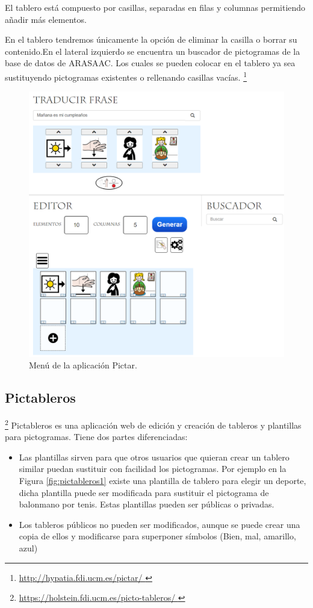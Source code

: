 El tablero está compuesto por casillas, separadas en filas y columnas permitiendo añadir más elementos.

En el tablero tendremos únicamente la opción de eliminar la casilla o borrar su contenido.En el lateral izquierdo se encuentra un buscador de pictogramas de la base de datos de ARASAAC. Los cuales se pueden colocar en el tablero ya sea sustituyendo pictogramas existentes o rellenando casillas vacías.
\footnote{\url{ http://hypatia.fdi.ucm.es/pictar/ }}

\begin{figure}[h!]
	\centering
	\includegraphics[width=0.7\linewidth]{Imagenes/Bitmap/Pictar}
	\caption{Menú de la aplicación Pictar.}
	\label{fig:pictar}
\end{figure}

\newpage
\subsection{Pictableros}
\footnote{\url{ https://holstein.fdi.ucm.es/picto-tableros/  }}
Pictableros es una aplicación web de edición y creación de tableros y plantillas para pictogramas. Tiene dos partes diferenciadas:

\begin{itemize}
	\item Las plantillas sirven para que otros usuarios que quieran crear un tablero similar puedan sustituir con facilidad los pictogramas. Por ejemplo en la Figura \ref{fig:pictableros1} existe una plantilla de tablero para elegir un deporte, dicha plantilla puede ser modificada para sustituir el pictograma de balonmano por tenis. Estas plantillas pueden ser públicas o privadas.
	
	\item Los tableros públicos no pueden ser modificados, aunque  se puede crear una copia de ellos y modificarse para superponer símbolos (Bien, mal, amarillo, azul)
	

\end{itemize}

